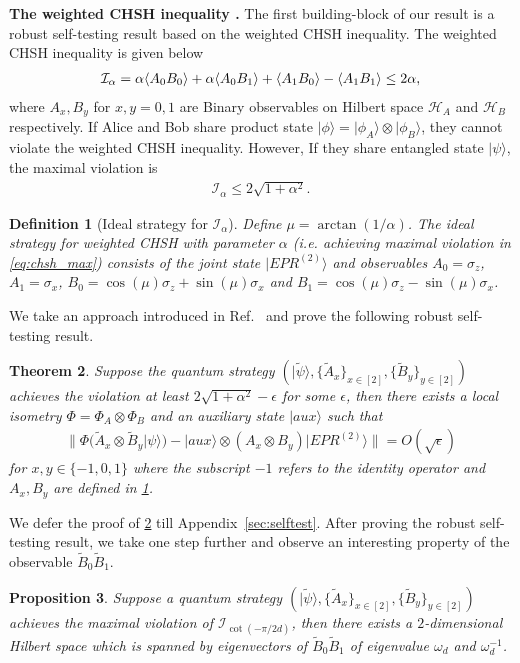 \documentclass[11pt,letterpaper]{article}
\newcommand{\ket}[1]{|#1\rangle}
\newcommand{\x}{\otimes}
\DeclarePairedDelimiter{\ip}{\langle}{\rangle}
\newcommand{\calH}{\mathcal{H}}
\newcommand{\1}{\mathbb{1}}
\newcommand{\EPR}[1]{EPR^{(#1)}}
\newcommand{\paulix}{\sigma_x}
\newcommand{\pauliz}{\sigma_z}
\newcommand{\tpsi}{\tilde{\psi}}
\newcommand{\I}{\mathcal{I}}
\newtheorem{theorem}{Theorem}
\newtheorem{proposition}[theorem]{Proposition}
\newtheorem{definition}[theorem]{Definition}
\theoremstyle{definition}
\begin{document}
\textbf{The weighted CHSH inequality \cite{acin2012}.}
The first building-block of our result is a robust self-testing result based on the weighted CHSH inequality.
The weighted CHSH inequality is given below 
\begin{align}
	\label{eq:chsh_op}
	\I_\alpha = \alpha\ip{A_0B_0}+\alpha\ip{A_0B_1} + \ip{A_1B_0} - \ip{A_1B_1}\leq 2\alpha,
\end{align}
where $A_x,B_y$ for $x,y = 0,1$ are Binary observables on Hilbert space $\calH_A$ and $\calH_B$ respectively.
If Alice and Bob share product state $\ket{\phi} = \ket{\phi_A} \x \ket{\phi_B}$, they cannot violate
the weighted CHSH inequality.
However, If they share entangled state $\ket{\psi}$, the maximal violation is 
\begin{align}
\label{eq:chsh_max}
 \I_\alpha \leq 2\sqrt{1+\alpha^2}.
\end{align}
\begin{definition}[Ideal strategy for $\I_\alpha$]
	\label{def:ideal}
	Define $\mu = \arctan(1/\alpha)$.
	The ideal strategy for weighted CHSH with parameter $\alpha$ (i.e. achieving maximal violation in \cref{eq:chsh_max})
	consists of the joint state $\ket{\EPR{2}}$ and observables $A_0 = \pauliz$, $A_1 = \paulix$,
	$B_0 = \cos(\mu) \pauliz+ \sin(\mu) \paulix$ and $B_1 = \cos(\mu) \pauliz - \sin(\mu) \paulix$.
\end{definition}
We take an approach introduced in Ref.~\cite{bamps2015} and prove the following robust self-testing result.
\begin{theorem}
\label{thm:selftest}
	Suppose the quantum strategy $(\ket{\tpsi}, \{\tilde{A}_x\}_{x \in [2]}, \{\tilde{B}_y\}_{y \in [2]})$ achieves the violation
	at least $2\sqrt{1+\alpha^2} - \epsilon$
	for some $\epsilon$, then
	there exists a local isometry $\Phi = \Phi_A \x \Phi_B$ and an auxiliary state $\ket{aux}$  such that
	\begin{align}
		\| \Phi( \tilde{A}_x \x \tilde{B}_y \ket{\psi}) -\ket{aux} \x (A_x \x B_y) \ket{\EPR{2}}  \| = O(\sqrt{\epsilon})
	\end{align}
	for $x,y \in \{-1, 0, 1\}$ where the subscript $-1$ refers to the identity operator and $A_x, B_y$ are 
	defined in \cref{def:ideal}.
\end{theorem}
We defer the proof of \cref{thm:selftest} till Appendix~\ref{sec:selftest}.
After proving the robust self-testing result, we take one step further and observe an interesting property of the 
observable $\tilde{B}_0\tilde{B}_1$.
\begin{proposition}
\label{prop:2d-subspace}
	Suppose a quantum strategy $(\ket{\tpsi}, \{\tilde{A}_x\}_{x \in [2]}, \{\tilde{B}_y\}_{y \in [2]})$ achieves the maximal 
	violation of  $\I_{\cot(-\pi/2d)}$, then there exists a $2$-dimensional Hilbert space which is spanned by eigenvectors of 
	$\tilde{B}_0\tilde{B}_1$ of eigenvalue $\omega_d$ and $\omega_d^{-1}$.
\end{proposition}
\end{document}
